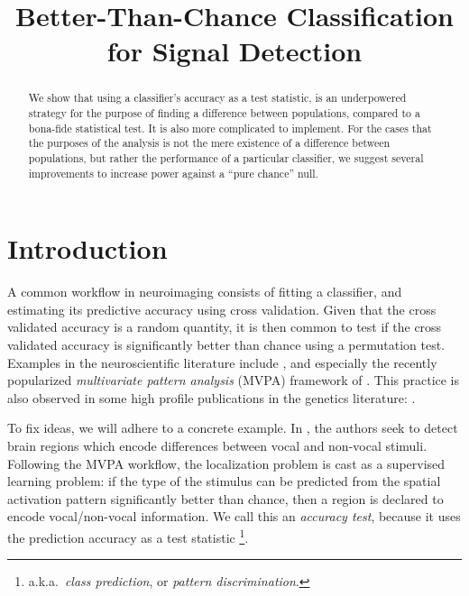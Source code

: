 \documentclass[12pt,a4paper]{article}
\title{Better-Than-Chance Classification for Signal Detection}
\begin{document}


\maketitle

\begin{abstract}
We show that using a classifier's accuracy as a test statistic, is an underpowered strategy for the purpose of finding a difference between populations, compared to a bona-fide statistical test.
It is also more complicated to implement. 
For the cases that the purposes of the analysis is not the mere existence of a difference between populations, but rather the performance of a particular classifier, we suggest several improvements to increase power against a ``pure chance'' null. 
\end{abstract}


\section{Introduction}
\label{sec:introduction}

A common workflow in neuroimaging consists of fitting a classifier, and estimating its predictive accuracy using cross validation. 
Given that the cross validated accuracy is a random quantity, it is then common to test if the cross validated accuracy is significantly better than chance using a permutation test.  
Examples in the neuroscientific literature include \citet{golland_permutation_2003,pereira_machine_2009,varoquaux_assessing_2016}, and especially the recently popularized \emph{multivariate pattern analysis} (MVPA) framework of \citet{kriegeskorte_information-based_2006}.
This practice is also observed in some high profile publications in the genetics literature: 
\citet{golub_molecular_1999,slonim_class_2000,radmacher_paradigm_2002,mukherjee_estimating_2003,juan_prediction_2004,jiang_calculating_2008}.


To fix ideas, we will adhere to a concrete example.
In \cite{gilron_quantifying_2016}, the authors seek to detect brain regions which encode differences between vocal and non-vocal stimuli. 
Following the MVPA workflow, the localization problem is cast as a supervised learning problem: if the type of the stimulus can be predicted from the spatial activation pattern significantly better than chance, then a region is declared to encode vocal/non-vocal information. 
We call this an \emph{accuracy test}, because it uses the prediction accuracy as a test statistic \footnote{a.k.a.\ \emph{class prediction}, or \emph{pattern discrimination}.}. 
\end{document}
